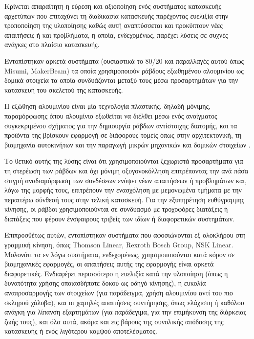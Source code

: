 Κρίνεται απαραίτητη η εύρεση και αξιοποίηση ενός συστήματος κατασκευής αρχετύπων
που επιταχύνει τη διαδικασία κατασκευής παρέχοντας ευελιξία στην τροποποίηση της
υλοποίησης καθώς αυτή αναπτύσσεται και προκύπτουν νέες απαιτήσεις ή και
προβλήματα, η οποία, ενδεχομένως, παρέχει λύσεις σε συχνές ανάγκες στο πλαίσιο
κατασκευής.

Εντοπίστηκαν αρκετά συστήματα (ουσιαστικά το 80/20 και παραλλαγές αυτού όπως
Misumi, MakerBeam) τα οποία χρησιμοποιούν ράβδους εξωθημένου αλουμινίου ως
δομικά στοιχεία τα οποία συνδυάζονται μεταξύ τους μέσω προσαρτημάτων για την
κατασκευή του σκελετού της κατασκευής.

Η εξώθηση αλουμινίου είναι μία τεχνολογία πλαστικής, δηλαδή μόνιμης,
παραμόρφωσης όπου αλουμίνιο εξωθείται να διέλθει μέσω ενός ανοίγματος
συγκεκριμένου σχήματος για την δημιουργία ράβδων αντίστοιχης διατομής, και τα
προϊόντα της βρίσκουν εφαρμογή σε διάφορους τομείς όπως στην αρχιτεκτονική,
τη βιομηχανία αυτοκινήτων και την παραγωγή μικρών μηχανικών και δομικών
στοιχείων \parencite{saha00}.

Το θετικό αυτής της λύσης είναι ότι χρησιμοποιούνται ξεχωριστά προσαρτήματα για
τη στερέωση των ράβδων και όχι μόνιμη οξυγονοκόλληση επιτρέποντας την ανά πάσα
στιγμή αναδιαμόρφωση των συνδέσεων ενόψει νέων απαιτήσεων ή προβλημάτων και,
λόγω της μορφής τους, επιτρέπουν την ενασχόληση με μεμονωμένα τμήματα με την
περαιτέρω σύνθεσή τους στην τελική κατασκευή.
Για την εξυπηρέτηση ευθύγραμμης κίνησης, οι ράβδοι χρησιμοποιούνται σε συνδυασμό
με τροχοφόρες διατάξεις ή διατάξεις που φέρουν ένσφαιρους τριβείς των ιδίων ή
διαφορετικών συστημάτων.

Επιπροσθέτως αυτών, εντοπίστηκαν συστήματα που αφοσιώνονται εξ ολοκλήρου στη
γραμμική κίνηση, όπως Thomson Linear, Rexroth Bosch Group, NSK Linear.
Μολονότι τα εν λόγω συστήματα, ενδεχομένως, χρησιμοποιούνται κατά κόρον σε
βιομηχανικές εφαρμογές, οι απαιτήσεις αυτής της εφαρμογής είναι αρκετά
διαφορετικές. Ενδιαφέρει περισσότερο η ευελιξία κατά την υλοποίηση (όπως η
δυνατότητα χρήσης οποιασδήποτε δοκού ως οδηγό κίνησης), η ευκολία αναπροσαρμογής
των στοιχείων (για παράδειγμα, χρήση αλουμινίου αντί του πιο σκληρού χάλυβα),
και οι χαμηλές απαιτήσεις συντήρησης, όπως ελάχιστη ή καθόλου ανάγκη για λίπανση
εξαρτημάτων (για παράδεγιμα, για την επιμήκυνση της διάρκειας ζωής τους), και
όλα αυτά, ακόμα και εις βάρους της συνολικής απόδοσης της κατασκευής ή ενός
λιγότερου κομψού αποτελέσματος.


